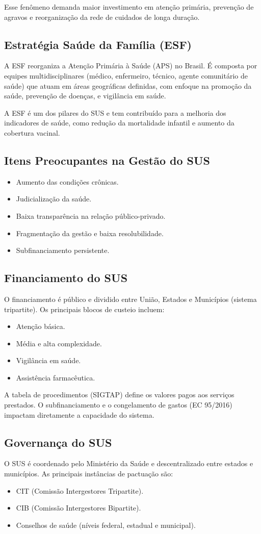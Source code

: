 \documentclass[a4paper,12pt]{article}
\begin{document}
Esse fenômeno demanda maior investimento em atenção primária, prevenção de agravos e reorganização da rede de cuidados de longa duração.
\subsection{Estratégia Saúde da Família (ESF)}
\label{sec:orga5a7964}
A ESF reorganiza a Atenção Primária à Saúde (APS) no Brasil. É composta por equipes multidisciplinares (médico, enfermeiro, técnico, agente comunitário de saúde) que atuam em áreas geográficas definidas, com enfoque na promoção da saúde, prevenção de doenças, e vigilância em saúde.

A ESF é um dos pilares do SUS e tem contribuído para a melhoria dos indicadores de saúde, como redução da mortalidade infantil e aumento da cobertura vacinal.
\subsection{Itens Preocupantes na Gestão do SUS}
\label{sec:org716cabe}
\begin{itemize}
\item Aumento das condições crônicas.
\item Judicialização da saúde.
\item Baixa transparência na relação público-privado.
\item Fragmentação da gestão e baixa resolubilidade.
\item Subfinanciamento persistente.
\end{itemize}
\subsection{Financiamento do SUS}
\label{sec:orgfe3ea22}
O financiamento é público e dividido entre União, Estados e Municípios (sistema tripartite). Os principais blocos de custeio incluem:
\begin{itemize}
\item Atenção básica.
\item Média e alta complexidade.
\item Vigilância em saúde.
\item Assistência farmacêutica.
\end{itemize}

A tabela de procedimentos (SIGTAP) define os valores pagos aos serviços prestados. O subfinanciamento e o congelamento de gastos (EC 95/2016) impactam diretamente a capacidade do sistema.
\subsection{Governança do SUS}
\label{sec:orgef0031d}
O SUS é coordenado pelo Ministério da Saúde e descentralizado entre estados e municípios. As principais instâncias de pactuação são:
\begin{itemize}
\item CIT (Comissão Intergestores Tripartite).
\item CIB (Comissão Intergestores Bipartite).
\item Conselhos de saúde (níveis federal, estadual e municipal).
\end{itemize}
\end{document}
